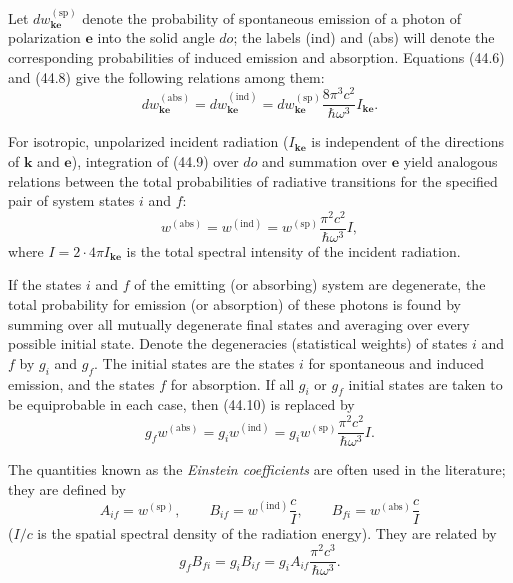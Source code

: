 Let $dw_{\mathbf k\mathbf e}^{(\text{sp})}$ denote the probability of spontaneous emission of a photon of polarization $\mathbf e$ into the solid angle $do$; the labels (ind) and (abs)
will denote the corresponding probabilities of induced emission and absorption. Equations (44.6) and (44.8) give the following relations among them:
\begin{equation}
dw_{\mathbf k\mathbf e}^{(\text{abs})}
=dw_{\mathbf k\mathbf e}^{(\text{ind})}
=dw_{\mathbf k\mathbf e}^{(\text{sp})}
\frac{8\pi^3c^2}{\hbar\omega^3}I_{\mathbf k\mathbf e}.
\tag{44.9}
\end{equation}

For isotropic, unpolarized incident radiation ($I_{\mathbf k\mathbf e}$ is independent of the directions of $\mathbf k$ and $\mathbf e$), integration of (44.9) over $do$ and summation over $\mathbf e$ yield analogous relations between the total probabilities of radiative transitions for the specified pair of system states $i$ and $f$:
\begin{equation}
w^{(\text{abs})}=w^{(\text{ind})}=w^{(\text{sp})}
\frac{\pi^2c^2}{\hbar\omega^3}I,
\tag{44.10}
\end{equation}
where $I=2\cdot4\pi I_{\mathbf k\mathbf e}$ is the total spectral intensity of the incident radiation.

If the states $i$ and $f$ of the emitting (or absorbing) system are degenerate, the total probability for emission (or absorption) of these photons is found by summing over all mutually degenerate final states and averaging over every possible initial state. Denote the degeneracies (statistical weights) of states $i$ and $f$ by $g_i$ and $g_f$. The initial states are the states $i$ for spontaneous and induced emission, and the states $f$ for absorption. If all $g_i$ or $g_f$ initial states are taken to be equiprobable in each case, then (44.10) is replaced by
\begin{equation}
g_fw^{(\text{abs})}=g_iw^{(\text{ind})}=g_iw^{(\text{sp})}
\frac{\pi^2c^2}{\hbar\omega^3}I.
\tag{44.11}
\end{equation}

The quantities known as the \emph{Einstein coefficients} are often used in the literature; they are defined by
\begin{equation}
A_{if}=w^{(\text{sp})},\qquad
B_{if}=w^{(\text{ind})}\frac cI,\qquad
B_{fi}=w^{(\text{abs})}\frac cI
\tag{44.12}
\end{equation}
($I/c$ is the spatial spectral density of the radiation energy). They are related by
\begin{equation}
g_fB_{fi}=g_iB_{if}=g_iA_{if}\frac{\pi^2c^3}{\hbar\omega^3}.
\tag{44.13}
\end{equation}
